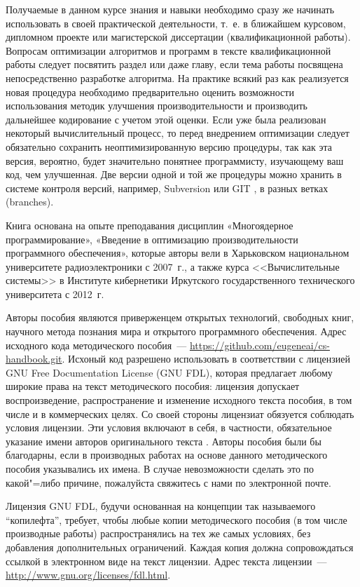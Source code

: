 \documentclass[14pt, a4paper, openany, twoside, final]{extbook} %
\begin{document}
Получаемые в данном курсе знания и навыки необходимо сразу же начинать использовать в своей практической деятельности, т.~е. в ближайшем курсовом, дипломном проекте или магистерской диссертации (квалификационной работы).  Вопросам оптимизации алгоритмов и программ в тексте квалификационной работы следует посвятить раздел или даже главу, если тема работы посвящена непосредственно разработке алгоритма.  На практике всякий раз как реализуется новая процедура необходимо предварительно оценить возможности использования методик улучшения производительности и производить дальнейшее кодирование с учетом этой оценки.  Если уже была реализован некоторый вычислительный процесс, то перед внедрением оптимизации следует обязательно сохранить неоптимизированную версию процедуры, так как эта версия, вероятно, будет значительно понятнее программисту, изучающему ваш код, чем улучшенная.  Две версии одной и той же процедуры можно хранить в системе контроля версий, например, Subversion \cite{svn} или GIT \cite{git}, в разных ветках (branches).

Книга основана на опыте преподавания дисциплин «Многоядерное программирование», «Введение в оптимизацию производительности программного обеспечения», которые авторы вели в Харьковском национальном университете радиоэлектроники с 2007~г., а также курса <<Вычислительные системы>> в Институте кибернетики Иркутского государственного технического университета с 2012~г.

Авторы пособия являются приверженцем открытых технологий, свободных книг, научного метода познания мира и открытого программного обеспечения.  Адрес исходного кода методического пособия~--- \url{https://github.com/eugeneai/cs-handbook.git}. Исхоный код разрешено использовать в соответствии с лицензией \foreignlanguage{english}{GNU Free Documentation License (GNU FDL)}, которая предлагает любому широкие права на текст методического пособия: лицензия допускает воспроизведение, распространение и изменение исходного текста пособия, в том числе и в коммерческих целях.  Со своей стороны лицензиат обязуется соблюдать условия лицензии.  Эти условия включают в себя, в частности, обязательное указание имени авторов оригинального текста \cite{GNUFDL}.  Авторы пособия были бы благодарны, если в производных работах на основе данного методического пособия указывались их имена.  В случае невозможности сделать это по какой"=либо причине, пожалуйста свяжитесь с нами по электронной почте.

Лицензия GNU FDL, будучи основанная на концепции так называемого ``копилефта'', требует, чтобы любые копии методического пособия (в том числе производные работы) распространялись на тех же самых условиях, без добавления дополнительных ограничений.  Каждая копия должна сопровождаться ссылкой в электронном виде на текст лицензии.  Адрес текста лицензии~--- \url{http://www.gnu.org/licenses/fdl.html}.
\end{document}
